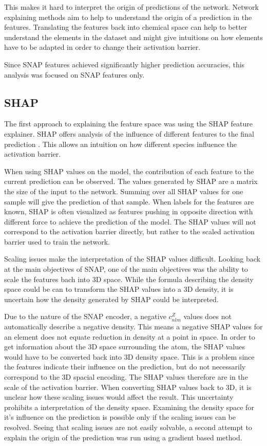 This makes it hard to interpret the origin of predictions of the network.
Network explaining methods aim to help to understand the origin of a prediction in the features.
Translating the features back into chemical space can help to better understand 
the elements in the dataset and might give intuitions on how elements have to be adapted in order to change their activation barrier.

Since SNAP features achieved significantly higher prediction accuracies,
this analysis was focused on SNAP features only.

\subsection{SHAP}

The first approach to explaining the feature space was using the SHAP feature explainer.
SHAP offers analysis of the influence of different features to the final prediction \cite{NIPS2017_7062}.
This allows an intuition on how different species influence the activation barrier.

When using SHAP values on the model, the contribution of each feature to the current prediction can be observed.
The values generated by SHAP are a matrix the size of the input to the network.
Summing over all SHAP values for one sample will give the prediction of that sample.
When labels for the features are  known, SHAP is often visualized as features pushing in opposite direction with different force 
to achieve the prediction of the model.
The SHAP values will not correspond to the activation barrier directly,
but rather to the scaled activation barrier used to train the network.

Scaling issues make the interpretation of the SHAP values difficult.
Looking back at the main objectives of SNAP, one of the main objectives was the ability to scale the features bach into 3D space.
While the formula describing the density space could be can to transform the SHAP values 
into a 3D density, it is uncertain how the density generated by SHAP could be interpreted.

Due to the nature of the SNAP encoder, a negative $c_{nlm}^Z$ values does not automatically 
describe a negative density.
This means a negative SHAP values for an element does not equate reduction in density
at a point in space.
In order to get information about the 3D space surrounding the atom, the SHAP values would have to be converted back into 3D density space.
This is a problem since the features indicate their influence on the prediction, but do not necessarily correspond 
to the 3D spacial encoding.
The SHAP values therefore are in the scale of the activation barrier.
When converting SHAP values back to 3D, it is unclear how these scaling issues would 
affect the result. 
This uncertainty prohibits a interpretation of the density space.
Examining the density space for it's influence on the prediction is possible only if the scaling
issues can be resolved.
Seeing that scaling issues are not easily solvable, a second attempt to explain the origin of the prediction
was run using a gradient based method.


